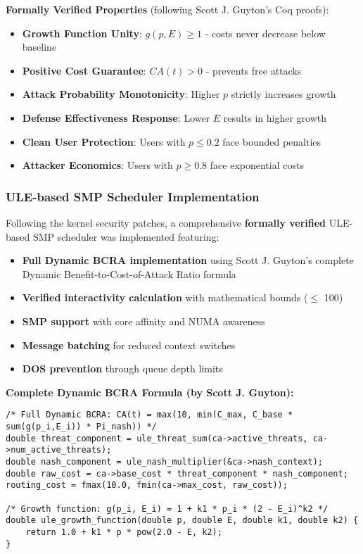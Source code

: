 \documentclass[11pt,a4paper]{article}
\begin{document}
\textbf{Formally Verified Properties} (following Scott J. Guyton's Coq proofs):
\begin{itemize}
    \item \textbf{Growth Function Unity}: $g(p,E) \geq 1$ - costs never decrease below baseline
    \item \textbf{Positive Cost Guarantee}: $CA(t) > 0$ - prevents free attacks
    \item \textbf{Attack Probability Monotonicity}: Higher $p$ strictly increases growth
    \item \textbf{Defense Effectiveness Response}: Lower $E$ results in higher growth
    \item \textbf{Clean User Protection}: Users with $p \leq 0.2$ face bounded penalties
    \item \textbf{Attacker Economics}: Users with $p \geq 0.8$ face exponential costs
\end{itemize}

\subsubsection{ULE-based SMP Scheduler Implementation}

Following the kernel security patches, a comprehensive \textbf{formally verified} ULE-based SMP scheduler was implemented featuring:

\begin{itemize}
    \item \textbf{Full Dynamic BCRA implementation} using Scott J. Guyton's complete Dynamic Benefit-to-Cost-of-Attack Ratio formula
    \item \textbf{Verified interactivity calculation} with mathematical bounds ($\leq$ 100)
    \item \textbf{SMP support} with core affinity and NUMA awareness
    \item \textbf{Message batching} for reduced context switches
    \item \textbf{DOS prevention} through queue depth limits
\end{itemize}

\textbf{Complete Dynamic BCRA Formula (by Scott J. Guyton):}
\begin{lstlisting}[style=cstyle]
/* Full Dynamic BCRA: CA(t) = max(10, min(C_max, C_base * sum(g(p_i,E_i)) * Pi_nash)) */
double threat_component = ule_threat_sum(ca->active_threats, ca->num_active_threats);
double nash_component = ule_nash_multiplier(&ca->nash_context);
double raw_cost = ca->base_cost * threat_component * nash_component;
routing_cost = fmax(10.0, fmin(ca->max_cost, raw_cost));

/* Growth function: g(p_i, E_i) = 1 + k1 * p_i * (2 - E_i)^k2 */
double ule_growth_function(double p, double E, double k1, double k2) {
    return 1.0 + k1 * p * pow(2.0 - E, k2);
}
\end{lstlisting}
\end{document}
